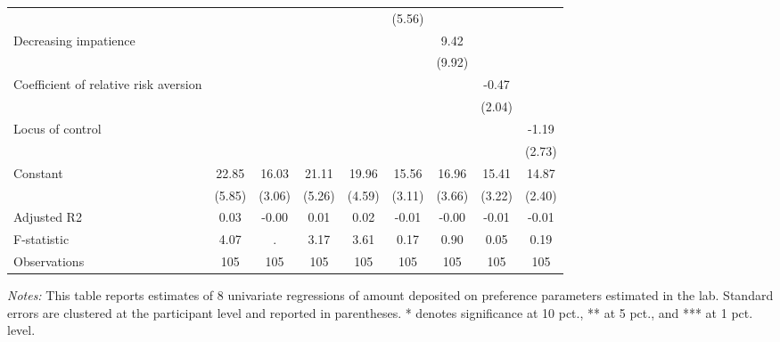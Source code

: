 \begin{table}[ht]
{\begin{threeparttable}
\begin{tabular}{l*{8}{c}}
                &                  &                  &                  &                  &   (5.56)         &                  &                  &                  \\
Decreasing impatience&                  &                  &                  &                  &                  &     9.42         &                  &                  \\
                &                  &                  &                  &                  &                  &   (9.92)         &                  &                  \\
Coefficient of relative risk aversion&                  &                  &                  &                  &                  &                  &    -0.47         &                  \\
                &                  &                  &                  &                  &                  &                  &   (2.04)         &                  \\
Locus of control&                  &                  &                  &                  &                  &                  &                  &    -1.19         \\
                &                  &                  &                  &                  &                  &                  &                  &   (2.73)         \\
Constant        &    22.85\sym{***}&    16.03\sym{***}&    21.11\sym{***}&    19.96\sym{***}&    15.56\sym{***}&    16.96\sym{***}&    15.41\sym{***}&    14.87\sym{***}\\
                &   (5.85)         &   (3.06)         &   (5.26)         &   (4.59)         &   (3.11)         &   (3.66)         &   (3.22)         &   (2.40)         \\
\midrule
Adjusted R2     &     0.03         &    -0.00         &     0.01         &     0.02         &    -0.01         &    -0.00         &    -0.01         &    -0.01         \\
F-statistic     &     4.07         &        .         &     3.17         &     3.61         &     0.17         &     0.90         &     0.05         &     0.19         \\
Observations    &      105         &      105         &      105         &      105         &      105         &      105         &      105         &      105         \\
\bottomrule \end{tabular} \begin{tablenotes}[flushleft] \footnotesize \item \emph{Notes:} This table reports estimates of 8 univariate regressions of amount deposited on preference parameters estimated in the lab. Standard errors are clustered at the participant level and reported in parentheses. * denotes significance at 10 pct., ** at 5 pct., and *** at 1 pct. level. \end{tablenotes} \end{threeparttable} } \end{table}
